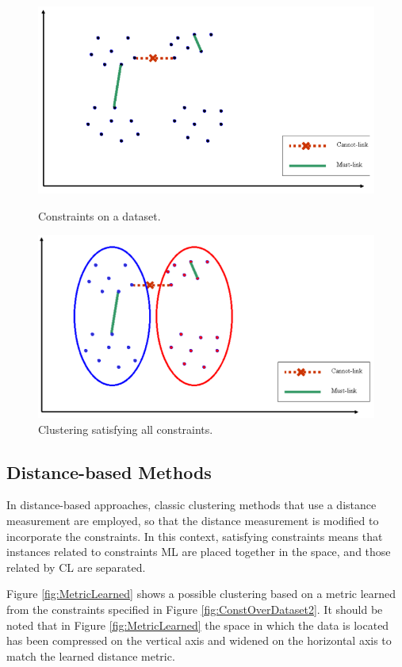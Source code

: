 \begin{figure}[bth]
	\myfloatalign
	{\includegraphics[width=.6\linewidth]{gfx/ConstClust/InputInstancesAndConst1}
	\caption[Constraints on a dataset.]{Constraints on a dataset. \cite{davidson2007survey}} \label{fig:ConstOverDataset}
	}
	{\includegraphics[width=.6\linewidth]{gfx/ConstClust/ClusteringSatAll}
	\caption[Clustering satisfying all constraints.]{Clustering satisfying all constraints. \cite{davidson2007survey}} \label{fig:ClusteringSatAllConst}
	}
\end{figure}

\subsection{Distance-based Methods}

In distance-based approaches, classic clustering methods that use a distance measurement are employed, so that the distance measurement is modified to incorporate the constraints. In this context, satisfying constraints means that instances related to constraints \acf{ML} are placed together in the space, and those related by \acf{CL} are separated.

Figure \ref{fig:MetricLearned} shows a possible clustering based on a metric learned from the constraints specified in Figure \ref{fig:ConstOverDataset2}. It should be noted that in Figure \ref{fig:MetricLearned} the space in which the data is located has been compressed on the vertical axis and widened on the horizontal axis to match the learned distance metric.

